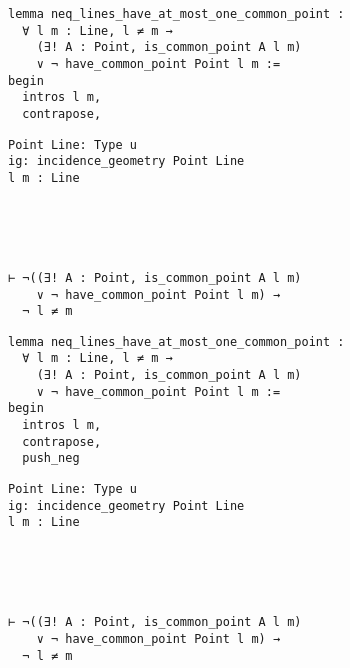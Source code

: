 \begin{frame}[fragile]
	\begin{multicols}{2}
		\begin{lstlisting}
lemma neq_lines_have_at_most_one_common_point :
  ∀ l m : Line, l ≠ m → 
    (∃! A : Point, is_common_point A l m) 
    ∨ ¬ have_common_point Point l m := 
begin
  intros l m,
  contrapose,
\end{lstlisting}
		\columnbreak
		\begin{lstlisting}
Point Line: Type u
ig: incidence_geometry Point Line
l m : Line





⊢ ¬((∃! A : Point, is_common_point A l m) 
    ∨ ¬ have_common_point Point l m) → 
  ¬ l ≠ m
		\end{lstlisting}
	\end{multicols}
\end{frame}










\begin{frame}[fragile]
	\begin{multicols}{2}
		\begin{lstlisting}
lemma neq_lines_have_at_most_one_common_point :
  ∀ l m : Line, l ≠ m → 
    (∃! A : Point, is_common_point A l m) 
    ∨ ¬ have_common_point Point l m := 
begin
  intros l m,
  contrapose,
  push_neg
\end{lstlisting}
		\columnbreak
		\begin{lstlisting}
Point Line: Type u
ig: incidence_geometry Point Line
l m : Line





⊢ ¬((∃! A : Point, is_common_point A l m) 
    ∨ ¬ have_common_point Point l m) → 
  ¬ l ≠ m
		\end{lstlisting}
	\end{multicols}
\end{frame}










